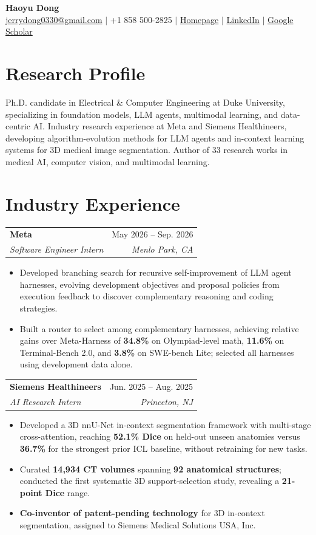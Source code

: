 \documentclass[letterpaper,10pt]{article}
\makeatletter
\newcommand{\entry}[4]{%
  \begin{tabular*}{\textwidth}{l@{\extracolsep{\fill}}r}
    \textbf{#1} & #2 \\
    \textit{#3} & \textit{#4}
  \end{tabular*}\vspace{-4pt}
}
\newcommand{\bullets}{\begin{itemize}[leftmargin=0.18in,topsep=3pt,itemsep=4pt,parsep=0pt,partopsep=0pt]}
\newcommand{\finishbullets}{\end{itemize}\vspace{2pt}}
\makeatother
\begin{document}
\begin{center}
  {\LARGE\textbf{Haoyu Dong}}\\[4pt]
  \href{mailto:jerrydong0330@gmail.com}{jerrydong0330@gmail.com} $\vert$
  +1 858 500-2825 $\vert$
  \href{https://haoyudong-97.github.io/}{Homepage} $\vert$
  \href{https://www.linkedin.com/in/haoyu-dong-63a801b9/}{LinkedIn} $\vert$
  \href{https://scholar.google.com/citations?hl=en\&user=eZVEUCIAAAAJ\&view_op=list_works}{Google Scholar}
\end{center}
\vspace{-8pt}

\section{Research Profile}
Ph.D. candidate in Electrical \& Computer Engineering at Duke University, specializing in foundation models, LLM agents, multimodal learning, and data-centric AI. Industry research experience at Meta and Siemens Healthineers, developing algorithm-evolution methods for LLM agents and in-context learning systems for 3D medical image segmentation. Author of 33 research works in medical AI, computer vision, and multimodal learning.

\section{Industry Experience}
\entry{Meta}{May 2026 -- Sep. 2026}{Software Engineer Intern}{Menlo Park, CA}
\bullets
  \item Developed branching search for recursive self-improvement of LLM agent harnesses, evolving development objectives and proposal policies from execution feedback to discover complementary reasoning and coding strategies.
  \item Built a router to select among complementary harnesses, achieving relative gains over Meta-Harness of \textbf{34.8\%} on Olympiad-level math, \textbf{11.6\%} on Terminal-Bench 2.0, and \textbf{3.8\%} on SWE-bench Lite; selected all harnesses using development data alone.
\finishbullets

\entry{Siemens Healthineers}{Jun. 2025 -- Aug. 2025}{AI Research Intern}{Princeton, NJ}
\bullets
  \item Developed a 3D nnU-Net in-context segmentation framework with multi-stage cross-attention, reaching \textbf{52.1\% Dice} on held-out unseen anatomies versus \textbf{36.7\%} for the strongest prior ICL baseline, without retraining for new tasks.
  \item Curated \textbf{14,934 CT volumes} spanning \textbf{92 anatomical structures}; conducted the first systematic 3D support-selection study, revealing a \textbf{21-point Dice} range.
  \item \textbf{Co-inventor of patent-pending technology} for 3D in-context segmentation, assigned to Siemens Medical Solutions USA, Inc.
\finishbullets
\end{document}
